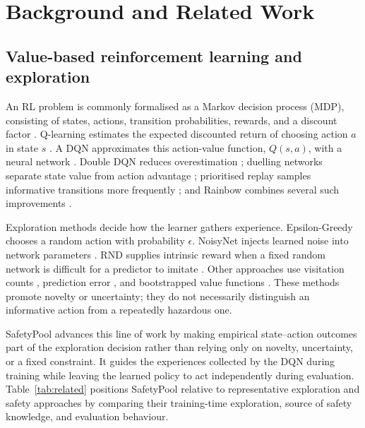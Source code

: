 \documentclass[runningheads]{llncs}
\begin{document}
\section{Background and Related Work}

\subsection{Value-based reinforcement learning and exploration}

An RL problem is commonly formalised as a Markov decision process (MDP), consisting of states, actions, transition probabilities, rewards, and a discount factor \cite{sutton2018reinforcement}. Q-learning estimates the expected discounted return of choosing action $a$ in state $s$ \cite{watkins1992qlearning}. A DQN approximates this action-value function, $Q(s,a)$, with a neural network \cite{mnih2015human}. Double DQN reduces overestimation \cite{hasselt2016double}; duelling networks separate state value from action advantage \cite{wang2016dueling}; prioritised replay samples informative transitions more frequently \cite{schaul2016prioritized}; and Rainbow combines several such improvements \cite{hessel2018rainbow}.

Exploration methods decide how the learner gathers experience. Epsilon-Greedy chooses a random action with probability $\epsilon$. NoisyNet injects learned noise into network parameters \cite{fortunato2018noisy}. RND supplies intrinsic reward when a fixed random network is difficult for a predictor to imitate \cite{burda2018rnd}. Other approaches use visitation counts \cite{bellemare2016count}, prediction error \cite{pathak2017curiosity}, and bootstrapped value functions \cite{osband2016bootstrapped}. These methods promote novelty or uncertainty; they do not necessarily distinguish an informative action from a repeatedly hazardous one.

SafetyPool advances this line of work by making empirical state--action outcomes part of the exploration decision rather than relying only on novelty, uncertainty, or a fixed constraint. It guides the experiences collected by the DQN during training while leaving the learned policy to act independently during evaluation. Table~\ref{tab:related} positions SafetyPool relative to representative exploration and safety approaches by comparing their training-time exploration, source of safety knowledge, and evaluation behaviour.
\end{document}
